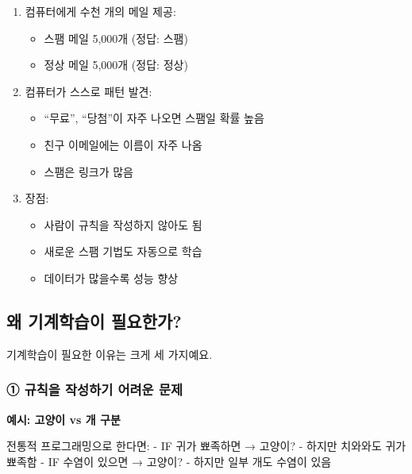 \documentclass[a4paper, 11pt]{article}
\providecommand{\tightlist}{%
  \setlength{\itemsep}{0pt}\setlength{\parskip}{0pt}}
\begin{document}
\begin{enumerate}
\def\labelenumi{\arabic{enumi}.}
\tightlist
\item
  컴퓨터에게 수천 개의 메일 제공:

  \begin{itemize}
  \tightlist
  \item
    스팸 메일 5,000개 (정답: 스팸)
  \item
    정상 메일 5,000개 (정답: 정상)
  \end{itemize}
\item
  컴퓨터가 스스로 패턴 발견:

  \begin{itemize}
  \tightlist
  \item
    ``무료'', ``당첨''이 자주 나오면 스팸일 확률 높음
  \item
    친구 이메일에는 이름이 자주 나옴
  \item
    스팸은 링크가 많음
  \end{itemize}
\item
  장점:

  \begin{itemize}
  \tightlist
  \item
    사람이 규칙을 작성하지 않아도 됨
  \item
    새로운 스팸 기법도 자동으로 학습
  \item
    데이터가 많을수록 성능 향상
  \end{itemize}
\end{enumerate}

\hypertarget{uxc65c-uxae30uxacc4uxd559uxc2b5uxc774-uxd544uxc694uxd55cuxac00}{%
\subsection{왜 기계학습이
필요한가?}\label{uxc65c-uxae30uxacc4uxd559uxc2b5uxc774-uxd544uxc694uxd55cuxac00}}

기계학습이 필요한 이유는 크게 세 가지예요.

\hypertarget{uxaddcuxce59uxc744-uxc791uxc131uxd558uxae30-uxc5b4uxb824uxc6b4-uxbb38uxc81c}{%
\subsubsection{\textbf{①} 규칙을 작성하기 어려운
문제}\label{uxaddcuxce59uxc744-uxc791uxc131uxd558uxae30-uxc5b4uxb824uxc6b4-uxbb38uxc81c}}

\textbf{예시: 고양이 vs 개 구분}

전통적 프로그래밍으로 한다면: - IF 귀가 뾰족하면 → 고양이? - 하지만
치와와도 귀가 뾰족함 - IF 수염이 있으면 → 고양이? - 하지만 일부 개도
수염이 있음
\end{document}
